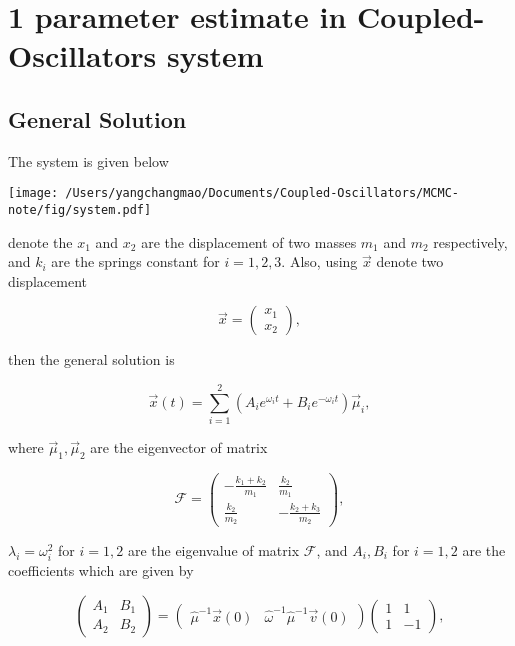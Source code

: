 \documentclass[
]{article}
\author{}
\date{}
\begin{document}
\hypertarget{1-parameter-estimate-in-coupled-oscillators-system}{%
\section{1 parameter estimate in Coupled-Oscillators
system}\label{1-parameter-estimate-in-coupled-oscillators-system}}

\hypertarget{general-solution}{%
\subsection{General Solution}\label{general-solution}}

The system is given below

\begin{center}
\texttt{[image: /Users/yangchangmao/Documents/Coupled-Oscillators/MCMC-note/fig/system.pdf]}
\end{center}

denote the \(x_1\) and \(x_2\) are the displacement of two masses
\(m_1\) and \(m_2\) respectively, and \(k_i\) are the springs constant
for \(i=1,2,3\). Also, using \(\vec{x}\) denote two displacement

\[\vec{x} = \begin{pmatrix}x_1\\x_2\end{pmatrix},\]

then the general solution is

\[\vec{x}\left(t\right) = \sum_{i=1}^{2}\left(A_{i}e^{\omega_i t}+ B_{i}e^{-\omega_i t}\right)\vec{\mu}_i,\]

where \(\vec{\mu}_1,\vec{\mu}_2\) are the eigenvector of matrix

\[\mathcal{F} = \begin{pmatrix}
 \displaystyle - \frac{k_1+k_2}{m_1}	&\displaystyle  \frac{k_2}{m_1}\\
 \displaystyle  \frac{k_2}{m_2} 		&\displaystyle  -\frac{k_2+k_3}{m_2}
 \end{pmatrix},\]

\(\lambda_i = \omega_i^2\) for \(i=1,2\) are the eigenvalue of matrix
\(\mathcal{F}\), and \(A_i, B_i\) for \(i=1,2\) are the coefficients
which are given by

\[\begin{pmatrix}A_{1}&B_{1}\\A_{2}&B_{2}\end{pmatrix}
=
\begin{pmatrix}
\hat{\mu}^{-1}\vec{x}\left(0\right) & 
\hat{\omega}^{-1}\hat{\mu}^{-1}\vec{v}\left(0\right)
\end{pmatrix}\begin{pmatrix}1&1\\ 1&-1\end{pmatrix},\]
\end{document}
